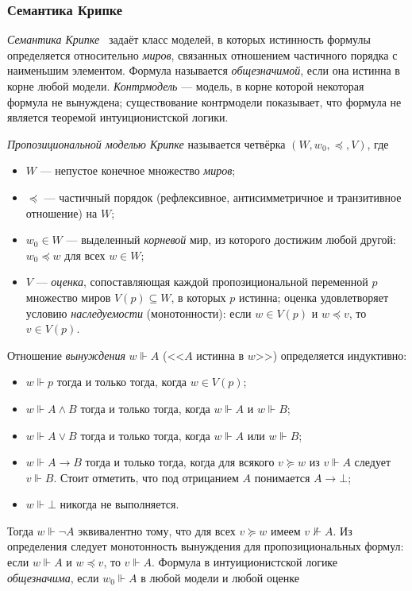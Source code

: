 \documentclass[14pt, russian]{scrartcl}
\begin{document}
\subsubsection{Семантика Крипке}
\emph{Семантика Крипке}~\cite{Kripke1965} задаёт класс моделей, в которых истинность формулы
определяется относительно \emph{миров}, связанных отношением частичного порядка с наименьшим элементом.
Формула называется \emph{общезначимой}, если она истинна в корне любой модели.
\emph{Контрмодель} --- модель, в корне которой некоторая формула не вынуждена;
существование контрмодели показывает, что формула не является теоремой
интуиционистской логики.

\emph{Пропозициональной моделью Крипке} называется четвёрка $(W, w_0, {\preceq}, V)$, где
\begin{itemize}
\item $W$ --- непустое конечное множество \emph{миров};
\item ${\preceq}$ --- частичный порядок (рефлексивное, антисимметричное и
  транзитивное отношение) на $W$;
\item $w_0 \in W$ --- выделенный \emph{корневой} мир, из которого достижим
  любой другой: $w_0 \preceq w$ для всех $w \in W$;
\item $V$ --- \emph{оценка}, сопоставляющая каждой пропозициональной переменной
  $p$ множество миров $V(p) \subseteq W$, в которых $p$ истинна; оценка
  удовлетворяет условию \emph{наследуемости} (монотонности): если $w \in V(p)$ и
  $w \preceq v$, то $v \in V(p)$.
\end{itemize} Отношение \emph{вынуждения} $w \Vdash A$
(<<$A$ истинна в $w$>>) определяется индуктивно:
\begin{itemize}
\item $w \Vdash p$ тогда и только тогда, когда $w \in V(p)$;
\item $w \Vdash A \land B$ тогда и только тогда, когда $w \Vdash A$ и $w \Vdash B$;
\item $w \Vdash A \lor B$ тогда и только тогда, когда $w \Vdash A$ или $w \Vdash B$;
\item $w \Vdash A \rightarrow B$ тогда и только тогда, когда для всякого $v \succeq w$ из $v \Vdash A$ следует $v \Vdash B$. Стоит отметить, что под отрицанием $A$ понимается $A \rightarrow \bot$;
\item $w \Vdash \bot$ никогда не выполняется.
\end{itemize}
Тогда $w \Vdash \neg A$ эквивалентно тому, что для всех $v \succeq w$ имеем $v
\not\Vdash A$. Из определения следует монотонность вынуждения для пропозициональных формул: если $w \Vdash A$
и $w \preceq v$, то $v \Vdash A$. Формула в интуиционистской логике
\emph{общезначима}, если $w_0 \Vdash A$ в любой модели и любой оценке
\end{document}
